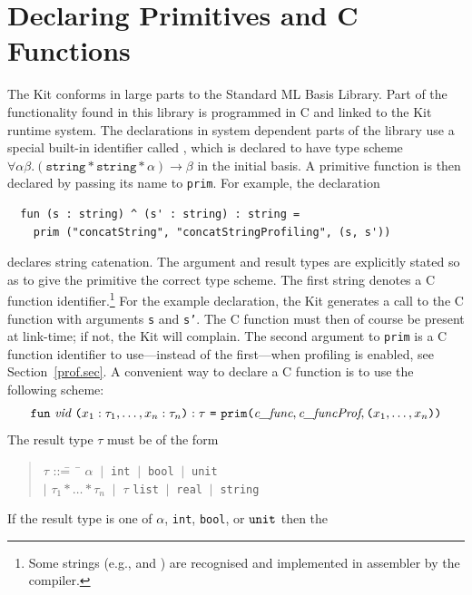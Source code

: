 \documentclass[12pt]{book}
\begin{document}
\section{Declaring Primitives and C Functions}
\label{parPassing.sec}
The Kit conforms in large parts to the Standard ML Basis Library. Part
of the functionality found in this library is programmed in C and
linked to the Kit runtime system.  The declarations in system
dependent parts of the library use a special built-in identifier
called , which is declared to have type
scheme $\forall \alpha \beta .  (\texttt{string} \ast \texttt{string}
\ast \alpha) \rightarrow \beta$ in the initial basis.  A primitive
function is then declared by passing its name to \texttt{prim}.  For
example, the declaration
\begin{verbatim}
  fun (s : string) ^ (s' : string) : string = 
    prim ("concatString", "concatStringProfiling", (s, s'))
\end{verbatim}
declares string catenation.  The argument and result types are
explicitly stated so as to give the primitive the correct type scheme.
The first string  denotes a C
function identifier.\footnote{Some strings (e.g.,  and ) are
  recognised and implemented in assembler by the compiler.} For the
example declaration, the Kit generates a call to the C function  with arguments {\tt s} and {\tt s'}. The C
function must then of course be present at link-time; if not, the Kit will complain. The second
argument to {\tt prim} is a C function identifier to use---instead of the first---when profiling is
enabled, see Section~\ref{prof.sec}. A convenient way to declare a C function is to use the
following scheme:
$$\texttt{fun}~ \emph{vid} ~\texttt{(}x_1:\tau_1, \ldots, x_n:\tau_n\texttt{)}
    : \tau ~\texttt{=} ~\texttt{prim(}\emph{c\_func}, \emph{c\_funcProf}, \texttt{(}
  x_1, \ldots, x_n\texttt{)} \texttt{)}
$$
The result type $\tau$ must be of the form
\begin{quote}
\begin{tabbing}
$\tau$ ::\== ~\= $\alpha$ $~|~$ {\tt int} $~|~$ {\tt bool} $~|~$ {\tt unit} \\ 
  \> $|$ \> $\tau_1 \ast \ldots \ast \tau_n$ $~|~$ $\tau$ {\tt list} $~|~$ {\tt real} $~|~$ {\tt string} 
\end{tabbing}
\end{quote}
\noindent
If the result type is one of $\alpha$, {\tt int}, {\tt bool}, or ${\tt unit}$ then the
\end{document}
